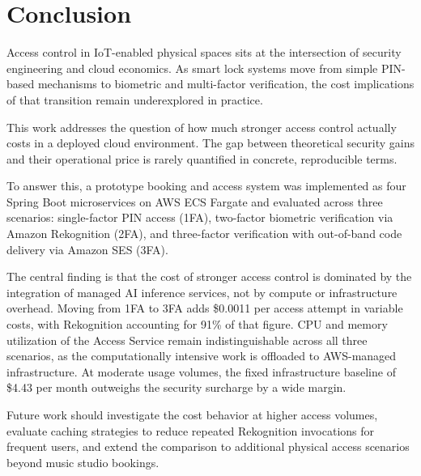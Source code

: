 \section{Conclusion}

Access control in IoT-enabled physical spaces sits at the intersection of security engineering and cloud economics. As smart lock systems move from simple PIN-based mechanisms to biometric and multi-factor verification, the cost implications of that transition remain underexplored in practice.

This work addresses the question of how much stronger access control actually costs in a deployed cloud environment. The gap between theoretical security gains and their operational price is rarely quantified in concrete, reproducible terms.

To answer this, a prototype booking and access system was implemented as four Spring Boot microservices on AWS ECS Fargate and evaluated across three scenarios: single-factor PIN access (1FA), two-factor biometric verification via Amazon Rekognition (2FA), and three-factor verification with out-of-band code delivery via Amazon SES (3FA).

The central finding is that the cost of stronger access control is dominated by the integration of managed AI inference services, not by compute or infrastructure overhead. Moving from 1FA to 3FA adds \$0.0011 per access attempt in variable costs, with Rekognition accounting for 91\% of that figure. CPU and memory utilization of the Access Service remain indistinguishable across all three scenarios, as the computationally intensive work is offloaded to AWS-managed infrastructure. At moderate usage volumes, the fixed infrastructure baseline of \$4.43 per month outweighs the security surcharge by a wide margin.

Future work should investigate the cost behavior at higher access volumes, evaluate caching strategies to reduce repeated Rekognition invocations for frequent users, and extend the comparison to additional physical access scenarios beyond music studio bookings.
